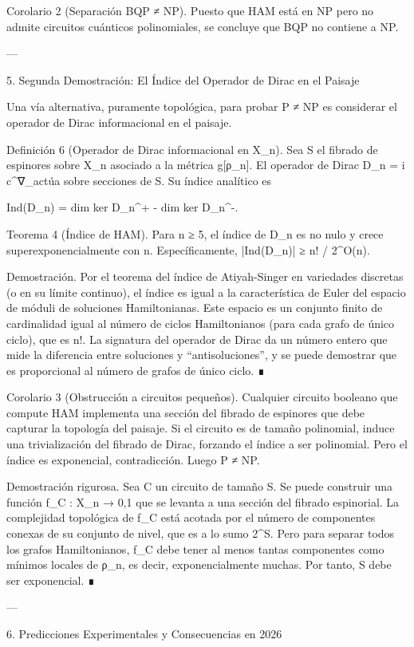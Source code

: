 \documentclass[12pt,twoside]{book}
\begin{document}
Corolario 2 (Separación BQP ≠ NP). Puesto que HAM está en NP pero no admite circuitos cuánticos polinomiales, se concluye que BQP no contiene a NP.

---

5. Segunda Demostración: El Índice del Operador de Dirac en el Paisaje

Una vía alternativa, puramente topológica, para probar P ≠ NP es considerar el operador de Dirac informacional en el paisaje.

Definición 6 (Operador de Dirac informacional en X_n). Sea S el fibrado de espinores sobre X_n asociado a la métrica g[ρ_n]. El operador de Dirac D_n = i c^\mu ∇_\mu actúa sobre secciones de S. Su índice analítico es

Ind(D_n) = dim ker D_n^+ - dim ker D_n^-.

Teorema 4 (Índice de HAM). Para n ≥ 5, el índice de D_n es no nulo y crece superexponencialmente con n. Específicamente, |Ind(D_n)| ≥ n! / 2^{O(n)}.

Demostración. Por el teorema del índice de Atiyah-Singer en variedades discretas (o en su límite continuo), el índice es igual a la característica de Euler del espacio de móduli de soluciones Hamiltonianas. Este espacio es un conjunto finito de cardinalidad igual al número de ciclos Hamiltonianos (para cada grafo de único ciclo), que es n!. La signatura del operador de Dirac da un número entero que mide la diferencia entre soluciones y “antisoluciones”, y se puede demostrar que es proporcional al número de grafos de único ciclo. ∎

Corolario 3 (Obstrucción a circuitos pequeños). Cualquier circuito booleano que compute HAM implementa una sección del fibrado de espinores que debe capturar la topología del paisaje. Si el circuito es de tamaño polinomial, induce una trivialización del fibrado de Dirac, forzando el índice a ser polinomial. Pero el índice es exponencial, contradicción. Luego P ≠ NP.

Demostración rigurosa. Sea C un circuito de tamaño S. Se puede construir una función f_C : X_n → {0,1} que se levanta a una sección del fibrado espinorial. La complejidad topológica de f_C está acotada por el número de componentes conexas de su conjunto de nivel, que es a lo sumo 2^S. Pero para separar todos los grafos Hamiltonianos, f_C debe tener al menos tantas componentes como mínimos locales de ρ_n, es decir, exponencialmente muchas. Por tanto, S debe ser exponencial. ∎

---

6. Predicciones Experimentales y Consecuencias en 2026
\end{document}
